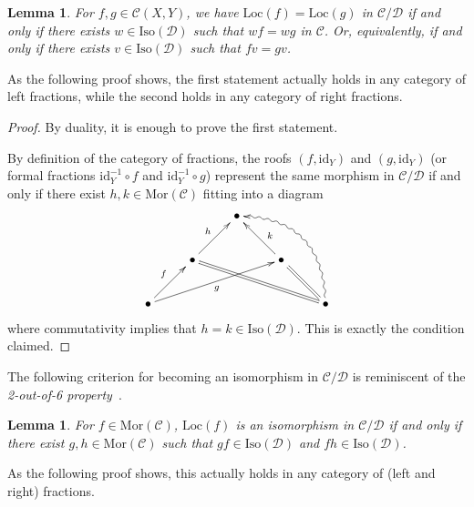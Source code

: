 \documentclass{amsproc}
\newtheorem{lem}[prop]{Lemma}
\theoremstyle{definition}
\begin{document}
\begin{lem}
\label{fraceq}
For $f,g\in{\mathcal{C}}(X,Y)$, we have ${\mathrm{Loc}}(f)={\mathrm{Loc}}(g)$ in ${\mathcal{C}}/{\mathcal{D}}$ if and only if there exists $w\in{\mathrm{Iso}}({\mathcal{D}})$ such that $wf=wg$ in ${\mathcal{C}}$. Or, equivalently, if and only if there exists $v\in{\mathrm{Iso}}({\mathcal{D}})$ such that $fv=gv$.
\end{lem}

As the following proof shows, the first statement actually holds in any category of left fractions, while the second holds in any category of right fractions.

\begin{proof}
By duality, it is enough to prove the first statement.

By definition of the category of fractions, the roofs $(f,{\mathrm{id}}_Y)$ and $(g,{\mathrm{id}}_Y)$ (or formal fractions ${\mathrm{id}}_Y^{-1}\circ f$ and ${\mathrm{id}}_Y^{-1}\circ g$) represent the same morphism in ${\mathcal{C}}/{\mathcal{D}}$ if and only if there exist $h,k\in{\mathrm{Mor}}({\mathcal{C}})$ fitting into a diagram
\[
	\xymatrix{ & & \bullet \\
		& \bullet \ar[ur]^h & & \bullet \ar[ul]_(.4)k \\
		\bullet \ar[ur]^f \ar[urrr]_g & & & & \bullet \ar@{=}[ul] \ar@{=}[ulll] \ar@{~>}@/_2pc/[uull] }
\]
where commutativity implies that $h=k\in{\mathrm{Iso}}({\mathcal{D}})$. This is exactly the condition claimed.
\end{proof}

The following criterion for becoming an isomorphism in ${\mathcal{C}}/{\mathcal{D}}$ is reminiscent of the \emph{2-out-of-6 property}~\cite{DHK}.

\begin{lem}
\label{isocrit1}
For $f\in{\mathrm{Mor}}({\mathcal{C}})$, ${\mathrm{Loc}}(f)$ is an isomorphism in ${\mathcal{C}}/{\mathcal{D}}$ if and only if there exist $g,h\in{\mathrm{Mor}}({\mathcal{C}})$ such that $gf\in{\mathrm{Iso}}({\mathcal{D}})$ and $fh\in{\mathrm{Iso}}({\mathcal{D}})$.
\end{lem}

As the following proof shows, this actually holds in any category of (left and right) fractions.
\end{document}
